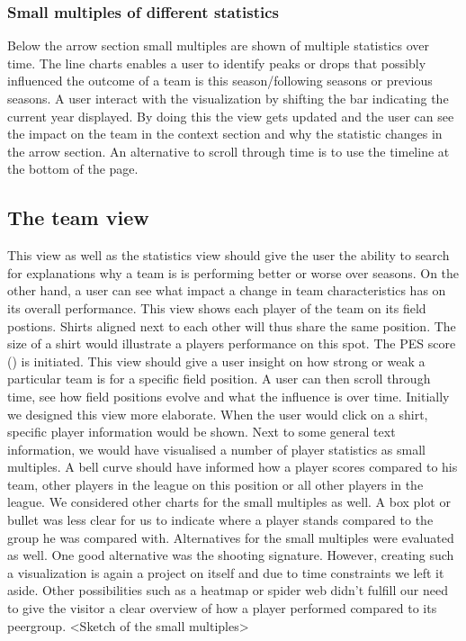 \documentclass{sigchi}
\begin{document}
\subsubsection{Small multiples of different statistics}
Below the arrow section small multiples are shown of multiple statistics over time. 
The line charts enables a user to identify peaks or drops that possibly influenced the 
outcome of a team is this season/following seasons or previous seasons. A user interact
with the visualization by shifting the bar indicating the current year displayed. By doing
this the view gets updated and the user can see the impact on the team in the context 
section and why the statistic changes in the arrow section. An alternative to scroll
through time is to use the timeline at the bottom of the page.

\subsection{The team view}
This view as well as the statistics view should give the user the ability to search
for explanations why a team is is performing better or worse over seasons. On the 
other hand, a user can see what impact a change in team characteristics has on its
overall performance.
This view shows each player of the team on its field postions. Shirts aligned next to 
each other will thus share the same position. The size of a shirt would illustrate a
players performance on this spot. The PES score () is initiated. This view should give
a user insight on how strong or weak a particular team is for a specific field position.
A user can then scroll through time, see how field positions evolve and what the influence
is over time.
Initially we designed this view more elaborate. When the user would click on a shirt,
specific player information would be shown. Next to some general text information, 
we would have visualised a number of player statistics as small multiples. A bell curve
should have informed how a player scores compared to his team, other players in the 
league on this position or all other players in the league. We considered other charts for
the small multiples as well. A box plot or bullet was less clear for us to indicate where
a player stands compared to the group he was compared with. Alternatives for the small 
multiples were evaluated as well. One good alternative was the shooting signature.\cite{peterbeshai}
However, creating such a visualization is again a project on itself and due to time 
constraints we left it aside. Other possibilities such as a heatmap or spider web didn't
fulfill our need to give the visitor a clear overview of how a player performed compared
to its peergroup.
<Sketch of the small multiples>
\end{document}
